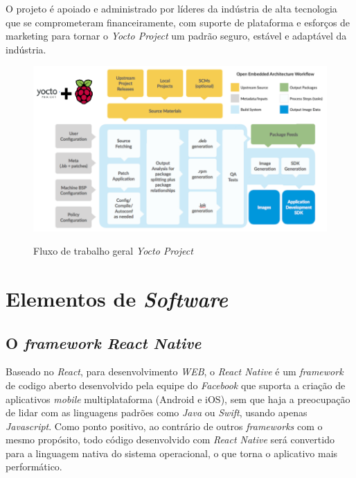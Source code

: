 O projeto é apoiado e administrado por líderes da indústria de alta tecnologia que se comprometeram financeiramente, com suporte de plataforma e esforços de marketing para tornar o \textit{Yocto Project} um padrão seguro, estável e adaptável da indústria.

\begin{figure}[H]
	\centering
	\caption{Fluxo de trabalho geral \textit{Yocto Project}}
	\includegraphics[width=1.0\textwidth]{figuras/yocto-fluxo.png}
	\label{fig:youcto-fluxo}
\end{figure} 

\section{Elementos de \textit{Software}}
\subsection{O \textit{framework React Native}}

Baseado no \textit{React}, para desenvolvimento \textit{WEB}, o \textit{React Native} é um \textit{framework} de codigo aberto desenvolvido pela equipe do \textit{Facebook} que suporta a criação de aplicativos \textit{mobile} multiplataforma (Android e iOS), sem que haja a preocupação de lidar com as linguagens padrões como \textit{Java} ou \textit{Swift}, usando apenas \textit{Javascript}. Como ponto positivo, ao contrário de outros \textit{frameworks} com o mesmo propósito, todo código desenvolvido com \textit{React Native} será convertido para a linguagem nativa do sistema operacional, o que torna o aplicativo mais performático.

